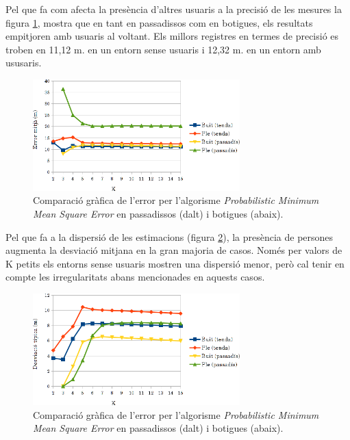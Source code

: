 Pel que fa com afecta la presència d'altres usuaris a la precisió de les mesures la figura \ref{fig:grafic_mitja_MMSE}, mostra que en tant en passadissos com en botigues, els resultats empitjoren amb usuaris al voltant. Els millors registres en termes de precisió es troben en 11,12 m. en un entorn sense usuaris i 12,32 m. en un entorn amb ususaris.

\begin{figure}[ht]
\begin{center}
\includegraphics[width=8cm]{imatges/mmse_mitja.png}
\caption{Comparació gràfica de l'error per l'algorisme \textit{Probabilistic Minimum Mean Square Error} en passadissos (dalt) i botigues (abaix).}
\label{fig:grafic_mitja_MMSE}
\end{center}
\end{figure}

Pel que fa a la dispersió de les estimacions (figura \ref{fig:grafic_desviacio_MMSE}), la presència de persones augmenta la desviació mitjana en la gran majoria de casos. Només per valors de K petits els entorns sense usuaris mostren una dispersió menor, però cal tenir en compte les irregularitats abans mencionades en aquests casos. 

\begin{figure}[ht]
\begin{center}
\includegraphics[width=8cm]{imatges/mmse_desviacio.png}
\caption{Comparació gràfica de l'error per l'algorisme \textit{Probabilistic Minimum Mean Square Error} en passadissos (dalt) i botigues (abaix).}
\label{fig:grafic_desviacio_MMSE}
\end{center}
\end{figure}
